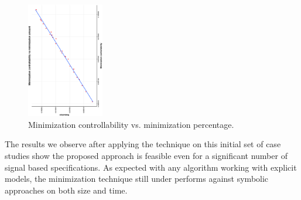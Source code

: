 \begin{figure}[bt]
	\centering
	\SmallPicture
	\includegraphics[width=0.3\textwidth, angle=-90]{../experimental_setting/tmp_results/min_ctrl_vs_min_pct.ps}
	\vspace*{-2mm}
	\caption{Minimization controllability vs. minimization percentage.}
	\label{fig:min_ctr_vs_min_pct}
	\vspace*{-4mm}
	\MediumPicture
\end{figure}

The results we observe after applying the technique on this initial set of case studies show the proposed approach is feasible even for a significant number of signal based specifications. 
As expected with any algorithm working with explicit models, the minimization technique still under performs against symbolic approaches on both size and time. 

